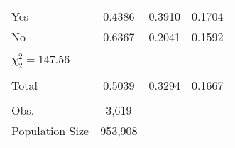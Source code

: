 \documentclass[11pt, oneside]{article}        %
\begin{document}
{\begin{center}
\begin{longtable}{lccc}
Yes                                    & 0.4386   & 0.3910     & 0.1704     \\
No                                     & 0.6367   & 0.2041     & 0.1592     \\
                                       &          &            &            \\
$\chi^2_2 = 147.56$                    &          &            &            \\
                                       &          &            &            \\
Total                                  & 0.5039   & 0.3294     & 0.1667     \\
                                       &          &            &            \\
Obs.                                   & 3,619    &            &            \\
Population Size                        & 953,908  &            &            \\ 
\end{longtable}
\end{center}}
\end{document}
